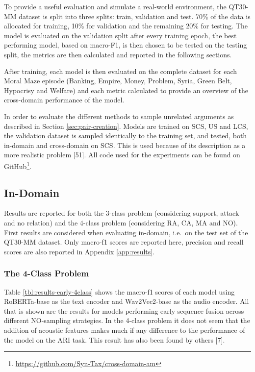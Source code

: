 \documentclass[twocolumn]{article}
\begin{document}
To provide a useful evaluation and simulate a real-world environment,
the QT30-MM dataset is split into three splits: train, validation and
test. 70\% of the data is allocated for training, 10\% for validation
and the remaining 20\% for testing. The model is evaluated on the
validation split after every training epoch, the best performing model,
based on macro-F1, is then chosen to be tested on the testing split, the
metrics are then calculated and reported in the following sections.

After training, each model is then evaluated on the complete dataset for
each Moral Maze episode (Banking, Empire, Money, Problem, Syria, Green
Belt, Hypocrisy and Welfare) and each metric calculated to provide an
overview of the cross-domain performance of the model.

In order to evaluate the different methods to sample unrelated arguments
as described in Section \ref{sec:pair-creation}. Models are trained on
SCS, US and LCS, the validation dataset is sampled identically to the
training set, and tested, both in-domain and cross-domain on SCS. This
is used because of its description as a more realistic problem {[}51{]}.
All code used for the experiments can be found on GitHub\footnote{\url{https://github.com/Syn-Tax/cross-domain-am}}.

\subsection{In-Domain}\label{sec:res-id}

Results are reported for both the 3-class problem (considering support,
attack and no relation) and the 4-class problem (considering RA, CA, MA
and NO). First results are considered when evaluating in-domain, i.e.~on
the test set of the QT30-MM dataset. Only macro-f1 scores are reported
here, precision and recall scores are also reported in Appendix
\ref{app:results}.

\subsubsection{The 4-Class Problem}\label{sec:id-4class}

Table \ref{tbl:results-early-4class} shows the macro-f1 scores of each
model using RoBERTa-base as the text encoder and Wav2Vec2-base as the
audio encoder. All that is shown are the results for models performing
early sequence fusion across different NO-sampling strategies. In the
4-class problem it does not seem that the addition of acoustic features
makes much if any difference to the performance of the model on the ARI
task. This result has also been found by others {[}7{]}.
\end{document}
